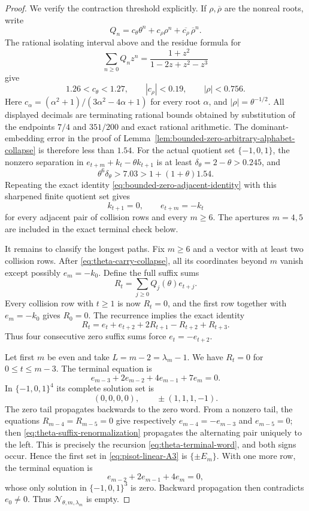 \begin{proof}
We verify the contraction threshold explicitly.  If
$\rho,\overline\rho$ are the nonreal roots, write
\[
Q_n=c_\theta\theta^n+c_\rho\rho^n+
\overline{c_\rho}\,\overline\rho^n.
\]
The rational isolating interval above and the residue formula for
\[
\sum_{n\ge0}Q_nz^n=\frac{1+z^2}{1-2z+z^2-z^3}
\]
give
\[
1.26<c_\theta<1.27,\qquad |c_\rho|<0.19,
\qquad |\rho|<0.756.
\]
Here $c_\alpha=(\alpha^2+1)/(3\alpha^2-4\alpha+1)$ for every root
$\alpha$, and $|\rho|=\theta^{-1/2}$.  All displayed decimals are terminating
rational bounds obtained by substitution of the endpoints $7/4$ and
$351/200$ and exact rational arithmetic.  The dominant-embedding error in
the proof of Lemma~\ref{lem:bounded-zero-arbitrary-alphabet-collapse} is
therefore less than $1.54$.  For the actual quotient set
$\{-1,0,1\}$, the nonzero separation in
$e_{t+m}+k_t-\theta k_{t+1}$ is at least
$\delta_\theta=2-\theta>0.245$, and
\[
\theta^6\delta_\theta>7.03
>1+(1+\theta)1.54.
\]
Repeating the exact identity
\eqref{eq:bounded-zero-adjacent-identity} with this sharpened finite quotient
set gives
\begin{equation}
k_{t+1}=0,\qquad e_{t+m}=-k_t
\label{eq:theta-carry-collapse}
\end{equation}
for every adjacent pair of collision rows and every $m\ge6$.  The apertures
$m=4,5$ are included in the exact terminal check below.

It remains to classify the longest paths.  Fix $m\ge6$ and a vector with at
least two collision rows.  After \eqref{eq:theta-carry-collapse}, all its
coordinates beyond $m$ vanish except possibly $e_m=-k_0$.  Define the full
suffix sums
\[
R_t=\sum_{j\ge0}Q_j(\theta)e_{t+j}.
\]
Every collision row with $t\ge1$ is now $R_t=0$, and the first row together
with $e_m=-k_0$ gives $R_0=0$.  The recurrence implies the exact identity
\begin{equation}
R_t=e_t+e_{t+2}+2R_{t+1}-R_{t+2}+R_{t+3}.
\label{eq:theta-suffix-renormalization}
\end{equation}
Thus four consecutive zero suffix sums force $e_t=-e_{t+2}$.

Let first $m$ be even and take $L=m-2=\lambda_m-1$.  We have
$R_t=0$ for $0\le t\le m-3$.  The terminal equation is
\[
e_{m-3}+2e_{m-2}+4e_{m-1}+7e_m=0.
\]
In $\{-1,0,1\}^4$ its complete solution set is
\begin{equation}
(0,0,0,0),\qquad \pm(1,1,1,-1).
\label{eq:theta-four-tail-table}
\end{equation}
The zero tail propagates backwards to the zero word.  From a nonzero tail,
the equations $R_{m-4}=R_{m-5}=0$ give respectively
$e_{m-4}=-e_{m-3}$ and $e_{m-5}=0$; then
\eqref{eq:theta-suffix-renormalization} propagates the alternating pair
uniquely to the left.  This is precisely the recursion
\eqref{eq:theta-terminal-word}, and both signs occur.  Hence the first set
in \eqref{eq:pisot-linear-A3} is $\{\pm E_m\}$.  With one more row, the
terminal equation is
\[
e_{m-2}+2e_{m-1}+4e_m=0,
\]
whose only solution in $\{-1,0,1\}^3$ is zero.  Backward propagation then
contradicts $e_0\ne0$.  Thus
$\mathcal N_{\theta,m,\lambda_m}$ is empty.


\end{proof}
